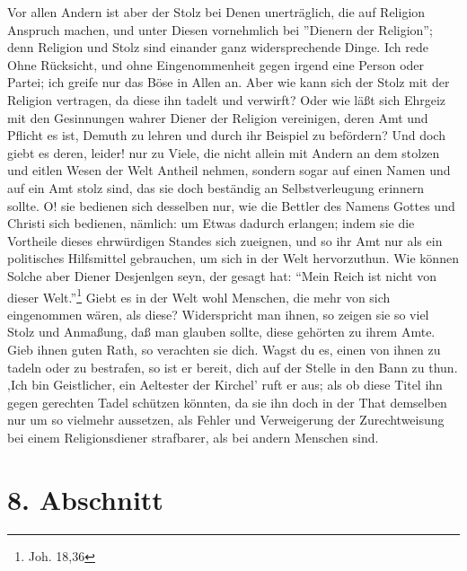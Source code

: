 Vor allen Andern ist aber der Stolz bei Denen unerträglich, die auf Religion
Anspruch machen, und unter Diesen vornehmlich bei ''Dienern der Religion''; denn
Religion und Stolz sind einander ganz widersprechende Dinge. Ich rede Ohne
Rücksicht, und ohne Eingenommenheit gegen irgend eine Person oder Partei; ich
greife nur das Böse in Allen an. Aber wie kann sich der Stolz mit der Religion
vertragen, da diese ihn tadelt und verwirft? Oder wie läßt sich Ehrgeiz mit den
Gesinnungen wahrer Diener der Religion vereinigen, deren Amt und Pflicht es ist,
Demuth zu lehren und durch ihr Beispiel zu befördern? Und doch giebt es deren,
leider! nur zu Viele, die nicht allein mit Andern an dem stolzen und eitlen
Wesen der Welt Antheil nehmen, sondern sogar auf einen Namen und auf ein Amt
stolz sind, das sie doch beständig an Selbstverleugung erinnern sollte. O! sie
bedienen sich desselben nur, wie die Bettler des Namens Gottes und Christi sich
bedienen, nämlich: um Etwas dadurch erlangen; indem sie die Vortheile dieses
ehrwürdigen Standes sich zueignen, und so ihr Amt nur als ein politisches
Hilfsmittel gebrauchen, um sich in der Welt hervorzuthun. Wie können Solche aber
Diener Desjenlgen seyn, der gesagt hat: "`Mein Reich ist nicht von dieser
Welt."'\footnote{Joh. 18,36} Giebt es in der Welt wohl Menschen, die mehr von
sich eingenommen wären, als diese? Widerspricht man ihnen, so zeigen sie so viel
Stolz und Anmaßung, daß man glauben sollte, diese gehörten zu ihrem Amte. Gieb
ihnen guten Rath, so verachten sie dich. Wagst du es, einen von ihnen zu tadeln
oder zu bestrafen, so ist er bereit, dich auf der Stelle in den Bann zu thun.
‚Ich bin Geistlicher, ein Aeltester der Kirchel’ ruft er aus; als ob diese Titel
ihn gegen gerechten Tadel schützen könnten, da sie ihn doch in der That
demselben nur um so vielmehr aussetzen, als Fehler und Verweigerung der
Zurechtweisung bei einem Religionsdiener strafbarer, als bei andern Menschen
sind.

\section{8. Abschnitt} \label{kap12_ab8}

